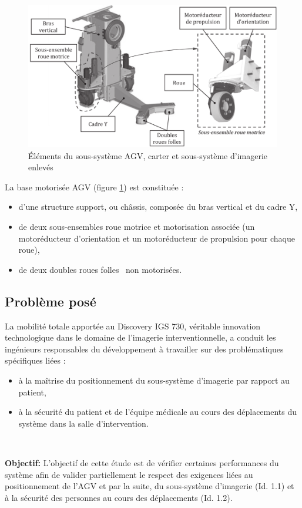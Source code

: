 \begin{figure}[ht!]
\begin{center}
 \includegraphics[width=0.7\linewidth]{img/fig06}
\end{center}
\caption{Éléments du sous-système AGV, carter et sous-système d'imagerie enlevés}
\label{fig06}
\end{figure}

La base motorisée AGV (figure \ref{fig06}) est constituée :
\begin{itemize}
 \item d'une structure support, ou châssis, composée du bras vertical et du cadre Y,
 \item de deux sous-ensembles roue motrice et motorisation associée (un motoréducteur d'orientation et un motoréducteur de propulsion pour chaque roue),
 \item de deux doubles roues \og folles \fg\ non motorisées.
\end{itemize}


\subsection{Problème posé}

La mobilité totale apportée au Discovery IGS 730, véritable innovation technologique dans le domaine de l'imagerie interventionnelle, a conduit les ingénieurs responsables du développement à travailler sur des problématiques spécifiques liées :
\begin{itemize}
 \item à la maîtrise du positionnement du sous-système d'imagerie par rapport au patient,
 \item à la sécurité du patient et de l'équipe médicale au cours des déplacements du système dans la salle d'intervention.
\end{itemize}

~\

\textbf{Objectif:} L'objectif de cette étude est de vérifier certaines performances du système afin de valider partiellement le respect des exigences liées au positionnement de l'AGV et par la suite, du sous-système d'imagerie (Id. 1.1) et à la sécurité des personnes au cours des déplacements (Id. 1.2).

